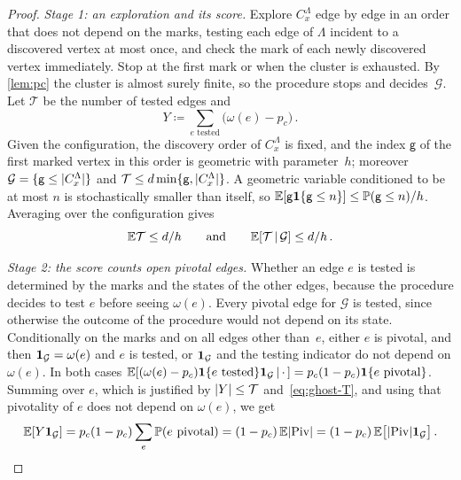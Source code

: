 \begin{proof}
\emph{Stage 1: an exploration and its score.} Explore $C_x^\Lambda$ edge by edge in an order that does
not depend on the marks, testing each edge of $\Lambda$ incident to a discovered vertex at most once,
and check the mark of each newly discovered vertex immediately. Stop at the first mark or when the
cluster is exhausted. By \cref{lem:pc} the cluster is almost surely finite, so the procedure stops and
decides~$\mathcal G$. Let $\mathcal T$ be the number of tested edges and
\begin{equation*}
  Y\coloneqq\sum_{e\text{ tested}}\bigl(\omega(e)-p_c\bigr)\,.
\end{equation*}
Given the configuration, the discovery order of $C_x^\Lambda$ is fixed, and the index $\mathsf g$ of the
first marked vertex in this order is geometric with parameter~$h$; moreover
$\mathcal G=\{\mathsf g\le\lvert C_x^\Lambda\rvert\}$ and $\mathcal T\le d\min\{\mathsf g,\lvert C_x^\Lambda\rvert\}$.
A geometric variable conditioned to be at most $n$ is stochastically smaller than itself, so
$\mathbb E[\mathsf g\mathbf{1}\{\mathsf g\le n\}]\le\mathbb P(\mathsf g\le n)/h$. Averaging over the configuration gives
\begin{equation}\label{eq:ghost-T}
  \mathbb E\mathcal T\le d/h\qquad\text{and}\qquad\mathbb E[\mathcal T\,\lvert\,\mathcal G]\le d/h\,.
\end{equation}

\emph{Stage 2: the score counts open pivotal edges.} Whether an edge $e$ is tested is determined by the
marks and the states of the other edges, because the procedure decides to test $e$ before seeing
$\omega(e)$. Every pivotal edge for $\mathcal G$ is tested, since otherwise the outcome of the
procedure would not depend on its state. Conditionally on the marks and on all edges other than~$e$,
either $e$ is pivotal, and then $\mathbf{1}_{\mathcal G}=\omega(e)$ and $e$ is tested, or $\mathbf{1}_{\mathcal G}$ and
the testing indicator do not depend on $\omega(e)$. In both cases
$\mathbb E[(\omega(e)-p_c)\mathbf{1}\{e\text{ tested}\}\mathbf{1}_{\mathcal G}\,\lvert\,\cdot\,]=p_c(1-p_c)\mathbf{1}\{e\text{ pivotal}\}$.
Summing over $e$, which is justified by $\lvert Y\rvert\le\mathcal T$ and~\eqref{eq:ghost-T}, and using that
pivotality of $e$ does not depend on $\omega(e)$, we get
\begin{equation}\label{eq:ghost-score}
  \mathbb E[Y\mathbf{1}_{\mathcal G}]=p_c(1-p_c)\sum_e\mathbb P(e\text{ pivotal})=(1-p_c)\,\mathbb E\lvert\operatorname{Piv}\rvert
  =(1-p_c)\,\mathbb E\bigl[\lvert\operatorname{Piv}\rvert\mathbf{1}_{\mathcal G}\bigr]\,.
\end{equation}


\end{proof}
